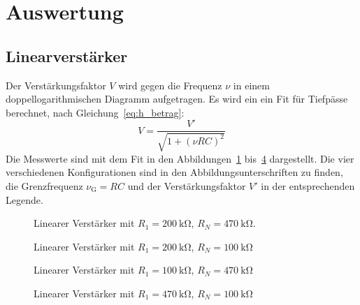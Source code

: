 \section{Auswertung}%
\label{sec:auswertung}
\subsection{Linearverst\"arker}
Der Verstärkungsfaktor $V$ wird gegen die Frequenz $\nu$ in einem doppellogarithmischen Diagramm aufgetragen.
Es wird ein ein Fit für Tiefpässe berechnet, nach Gleichung~\eqref{eq:h_betrag}:
\begin{equation}
  V = \frac{V'}{\sqrt{1 + {\left(\nu RC\right)}^{2}}}
\end{equation}
Die Messwerte sind mit dem Fit in den Abbildungen~\ref{fig:lin_verst_01} bis~\ref{fig:lin_verst_04} dargestellt.
Die vier verschiedenen Konfigurationen sind in den Abbildungsunterschriften zu finden,
die Grenzfrequenz $\nu_\text{G} = RC$ und der Verstärkungsfaktor $V'$ in der entsprechenden Legende.

\begin{figure}[ht]
  \centering
  
  \caption{Linearer Verst\"arker mit $R_1 = \SI{200}{\kilo\ohm}$, $R_N = \SI{470}{\kilo\ohm}$.}
  \label{fig:lin_verst_01}
\end{figure}

\begin{figure}[ht]
  \centering
  
  \caption{Linearer Verst\"arker mit $R_1 = \SI{200}{\kilo\ohm}$, $R_N = \SI{100}{\kilo\ohm}$}
  \label{fig:lin_verst_02}
\end{figure}

\begin{figure}[ht]
  \centering
  
  \caption{Linearer Verst\"arker mit $R_1 = \SI{100}{\kilo\ohm}$, $R_N = \SI{470}{\kilo\ohm}$}
  \label{fig:lin_verst_03}
\end{figure}

\begin{figure}[ht]
  \centering
  
  \caption{Linearer Verst\"arker mit $R_1 = \SI{470}{\kilo\ohm}$, $R_N = \SI{100}{\kilo\ohm}$}
  \label{fig:lin_verst_04}
\end{figure}


